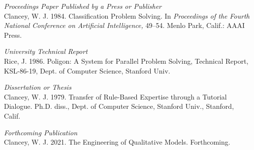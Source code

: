 \documentclass[letterpaper]{article} %
\begin{document}
\smallskip \noindent \textit{Proceedings Paper Published by a Press or Publisher}\\
Clancey, W. J. 1984. Classification Problem Solving. In \textit{Proceedings of the Fourth National Conference on Artificial Intelligence,} 49--54. Menlo Park, Calif.: AAAI Press.

\smallskip \noindent \textit{University Technical Report}\\
Rice, J. 1986. Poligon: A System for Parallel Problem Solving, Technical Report, KSL-86-19, Dept. of Computer Science, Stanford Univ.

\smallskip \noindent \textit{Dissertation or Thesis}\\
Clancey, W. J. 1979. Transfer of Rule-Based Expertise through a Tutorial Dialogue. Ph.D. diss., Dept. of Computer Science, Stanford Univ., Stanford, Calif.

\smallskip \noindent \textit{Forthcoming Publication}\\
Clancey, W. J. 2021. The Engineering of Qualitative Models. Forthcoming.


\citeyear{texbook,knuth:1984, latex2e}
\end{document}
